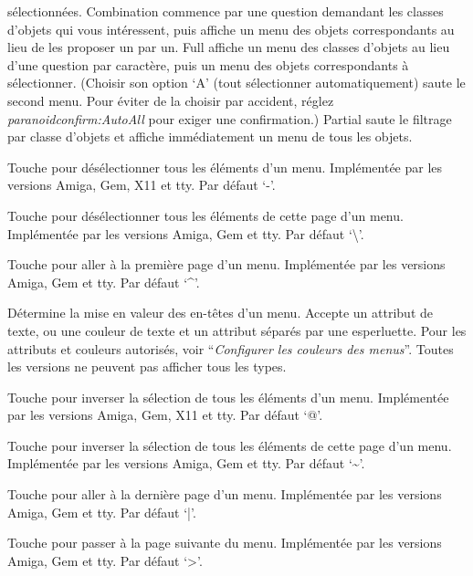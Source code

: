 \documentclass[titlepage]{article}
\begin{document}
\begin{description}[font=\mdseries\itshape]
sélectionnées.
Combination commence par une question demandant les classes d'objets
qui vous intéressent, puis affiche un menu des objets correspondants au lieu
de les proposer un par un.
Full affiche un menu des
classes d'objets au lieu d'une question par caractère, puis un menu des objets
correspondants à sélectionner.
(Choisir son option `A' (tout sélectionner automatiquement) saute le second menu.
Pour éviter de la choisir par accident,
réglez \textit{paranoid\textunderscore confirm:AutoAll} pour exiger une confirmation.)
Partial saute le filtrage par classe d'objets et
affiche immédiatement un menu de tous les objets.
\item[menu\textunderscore deselect\textunderscore all]
Touche pour désélectionner tous les éléments d'un menu.
Implémentée par les versions Amiga, Gem, X11 et tty.
Par défaut `-'.
\item[menu\textunderscore deselect\textunderscore page]
Touche pour désélectionner tous les éléments de cette page d'un menu.
Implémentée par les versions Amiga, Gem et tty.
Par défaut `\textbackslash'.
\item[menu\textunderscore first\textunderscore page]
Touche pour aller à la première page d'un menu.
Implémentée par les versions Amiga, Gem et tty.
Par défaut `\textasciicircum'.
\item[menu\textunderscore headings]
Détermine la mise en valeur des en-têtes d'un menu.
Accepte un attribut de texte, ou une couleur de texte et un attribut séparés par une esperluette.
Pour les attributs et couleurs autorisés, voir ``\textit{Configurer les couleurs des menus}''.
Toutes les versions ne peuvent pas afficher tous les types.
\item[menu\textunderscore invert\textunderscore all]
Touche pour inverser la sélection de tous les éléments d'un menu.
Implémentée par les versions Amiga, Gem, X11 et tty.
Par défaut `@'.
\item[menu\textunderscore invert\textunderscore page]
Touche pour inverser la sélection de tous les éléments de cette page d'un menu.
Implémentée par les versions Amiga, Gem et tty.
Par défaut `\textasciitilde'.
\item[menu\textunderscore last\textunderscore page]
Touche pour aller à la dernière page d'un menu.
Implémentée par les versions Amiga, Gem et tty.
Par défaut `|'.
\item[menu\textunderscore next\textunderscore page]
Touche pour passer à la page suivante du menu.
Implémentée par les versions Amiga, Gem et tty.
Par défaut `>'.
\item[menu\textunderscore objsyms]

\end{description}
\end{document}
